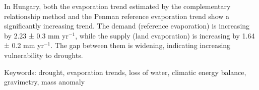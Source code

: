 In Hungary, both the evaporation trend estimated by the complementary relationship method and the Penman reference evaporation trend show a significantly increasing trend. The demand (reference evaporation) is increasing by 2.23 ± 0.3 mm yr$^{-1}$, while the supply (land evaporation) is increasing by 1.64 ± 0.2 mm yr$^{-1}$. The gap between them is widening, indicating increasing vulnerability to droughts.

Keywords:
drought, evaporation trends, loss of water, climatic energy balance, gravimetry, mass anomaly
\newpage{}
{}
\begin{flushleft}





\end{flushleft}

\noindent


